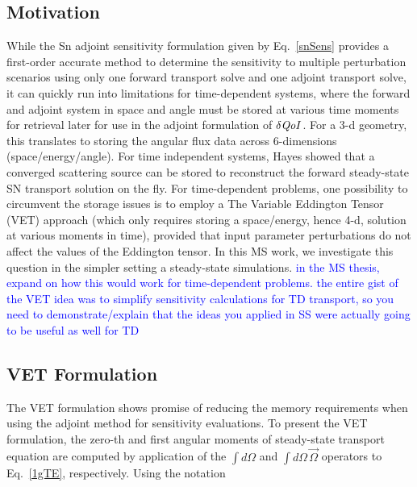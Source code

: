 \documentclass{article}
\newcommand{\vO}{\vec{\Omega}}
\newcommand{\qoi}{{\it QoI}\xspace}
\newcommand{\comment}[2]{\marginpar{\textcolor{#2}{$\star$}}\textcolor{#2}{#1}\newline}
\newcommand{\jcr}[1]{\comment{#1}{blue}}
\newcommand{\jcr}[1]{\phantom{a}}
\begin{document}
\subsection{Motivation} 
While the Sn adjoint sensitivity formulation given by Eq.~\eqref{snSens} provides a first-order accurate method to determine the sensitivity to multiple perturbation scenarios using only one forward transport solve and one adjoint transport solve, it can quickly run into limitations for time-dependent systems, where the forward and adjoint system in space and angle must be stored at various time moments for retrieval later for use in the adjoint formulation of $\delta \qoi$. For a 3-d geometry, this translates to storing the angular
flux data across 6-dimensions (space/energy/angle). For time independent systems, Hayes \cite{Stripling} showed that a converged scattering source can be stored to reconstruct 
the forward steady-state SN transport solution on the fly. For time-dependent problems, one possibility to circumvent the storage issues is to employ a The Variable Eddington Tensor (VET) approach (which only requires
storing a space/energy, hence 4-d, solution at various moments in time), provided that input parameter perturbations do not affect the values of the Eddington tensor. In this MS work,
we investigate this question in the simpler setting a steady-state simulations.
\jcr{in the MS thesis, expand on how this would work for time-dependent problems. the entire
gist of the VET idea was to simplify sensitivity calculations for TD transport, so you need
to demonstrate/explain that the ideas you applied in SS were actually going to be useful as well for TD}



\subsection{VET Formulation}

The VET formulation shows promise of reducing the memory requirements when using the adjoint method for sensitivity evaluations. To present the VET formulation, the zero-th and first angular moments of steady-state transport equation are computed by application of the $\int d \Omega$ and $\int d \Omega \, \vO$ operators to Eq.~\eqref{1gTE}, respectively. Using the notation
\end{document}
